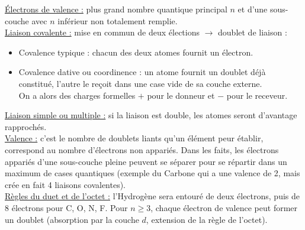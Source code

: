 \documentclass[13pt, twoside, a4paper, french, tikz]{report}
\begin{document}
    \underline{Électrons de valence :} plus grand nombre quantique principal $n$ et d'une sous-couche avec $n$ inférieur non totalement remplie.\\
    
    \underline{Liaison covalente :} mise en commun de deux élections $\rightarrow$ doublet de liaison :
    \begin{itemize}
      \item Covalence typique : chacun des deux atomes fournit un électron.
      \item Covalence dative ou coordinence : un atome fournit un doublet déjà constitué, l'autre le reçoit dans une case vide de sa couche externe.\\
      On a alors des charges formelles $+$ pour le donneur et $-$ pour le receveur.\\
    \end{itemize}
    
    \underline{Liaison simple ou multiple :} si la liaison est double, les atomes seront d'avantage rapprochés.\\
    
    \underline{Valence :} c'est le nombre de doublets liants qu'un élément peur établir, correspond au nombre d'électrons non appariés.
    Dans les faits, les électrons appariés d'une sous-couche pleine peuvent se séparer pour se répartir dans un maximum de cases quantiques (exemple du Carbone qui a une valence de 2, mais crée en fait 4 liaisons covalentes).\\
    
    \underline{Règles du duet et de l'octet :} l'Hydrogène sera entouré de deux électrons, puis de 8 électrons pour C, O, N, F.
    Pour $n \ge 3$, chaque électron de valence peut former un doublet (absorption par la couche $d$, extension de la règle de l'octet).
\end{document}
